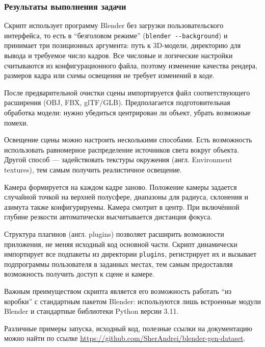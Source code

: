 \subsubsection{Результаты выполнения задачи}

Скрипт использует программу Blender без загрузки пользовательского интерфейса, то
есть в ``безголовом режиме'' (\texttt{blender -{}-background}) и принимает три
позиционных аргумента: путь к 3D-модели, директорию для вывода и требуемое число
кадров. Все числовые и логические настройки считываются из конфигурационного
файла, поэтому изменение качества рендера, размеров кадра или схемы освещения не
требует изменений в коде.

После предварительной очистки сцены импортируется файл соответствующего
расширения (OBJ, FBX, glTF/GLB). Предполагается подготовительная обработка
модели: нужно убедиться центрирован ли объект, убрать возможные помехи.

Освещение сцены можно настроить несколькими способами. Есть возможность использовать
равномерное распределение источников света вокруг объекта. Другой способ — задействовать
текстуры окружения (англ. Environment textures), тем самым получить реалистичное освещение.

Камера формируется на каждом кадре заново. Положение камеры задается случайной
точкой на верхней полусфере, диапазоны для радиуса, склонения и азимута также
конфигурируемы. Камера смотрит в центр. При включённой глубине резкости
автоматически высчитывается дистанция фокуса.

Структура плагинов (англ. plugins) позволяет расширить возможности приложения,
не меняя исходный код основной части. Скрипт динамически импортирует все подпакеты
из директории \texttt{plugins}, регистрирует их и вызывает подпрограммы пользователя
в заданных местах, тем самым предоставляя возможность получить доступ к сцене и камере.

Важным преимуществом скрипта является его возможность работать ``из коробки'' с стандартным
пакетом Blender: используются лишь встроенные модули Blender и стандартные библиотеки
Python версии 3.11.

Различные примеры запуска, исходный код, полезные ссылки на документацию можно найти
по ссылке \url{https://github.com/SherAndrei/blender-gen-dataset}.

